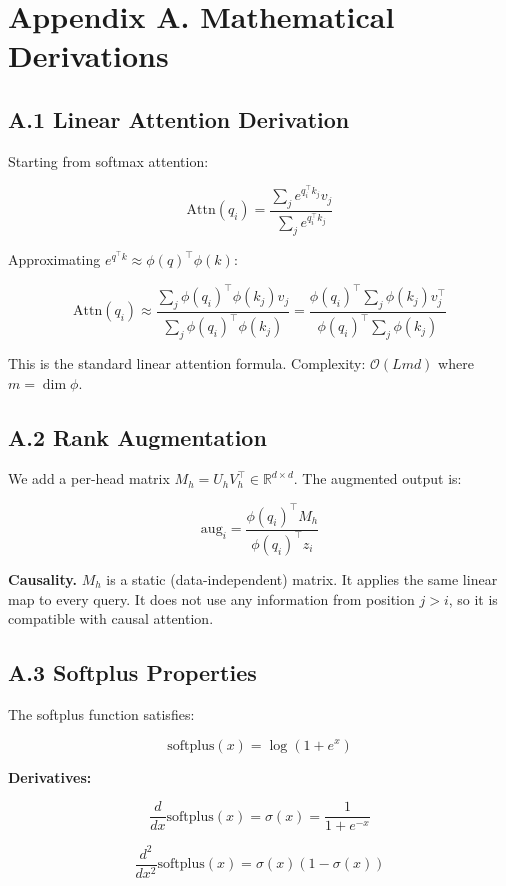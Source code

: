 
\section{Appendix A. Mathematical Derivations}

\subsection{A.1 Linear Attention Derivation}

Starting from softmax attention:

\[
\text{Attn}(q_i) = \frac{\sum_j e^{q_i^\top k_j} v_j}{\sum_j e^{q_i^\top k_j}}
\tag{A.1}
\]

Approximating $e^{q^\top k} \approx \phi(q)^\top \phi(k)$:

\[
\text{Attn}(q_i) \approx \frac{\sum_j \phi(q_i)^\top \phi(k_j) v_j}{\sum_j \phi(q_i)^\top \phi(k_j)}
= \frac{\phi(q_i)^\top \sum_j \phi(k_j) v_j^\top}{\phi(q_i)^\top \sum_j \phi(k_j)}
\tag{A.2}
\]

This is the standard linear attention formula. Complexity: $\mathcal{O}(L m d)$ 
where $m = \dim \phi$.

\subsection{A.2 Rank Augmentation}

We add a per-head matrix $M_h = U_h V_h^\top \in \mathbb{R}^{d \times d}$. 
The augmented output is:

\[
\text{aug}_i = \frac{\phi(q_i)^\top M_h}{\phi(q_i)^\top z_i}
\tag{A.3}
\]

\textbf{Causality.} $M_h$ is a static (data-independent) matrix. It applies the 
same linear map to every query. It does not use any information from position 
$j > i$, so it is compatible with causal attention.

\subsection{A.3 Softplus Properties}

The softplus function satisfies:

\[
\text{softplus}(x) = \log(1 + e^x)
\tag{A.4}
\]

\textbf{Derivatives:}

\[
\frac{d}{dx}\text{softplus}(x) = \sigma(x) = \frac{1}{1 + e^{-x}}
\tag{A.5}
\]

\[
\frac{d^2}{dx^2}\text{softplus}(x) = \sigma(x)(1 - \sigma(x))
\tag{A.6}
\]

